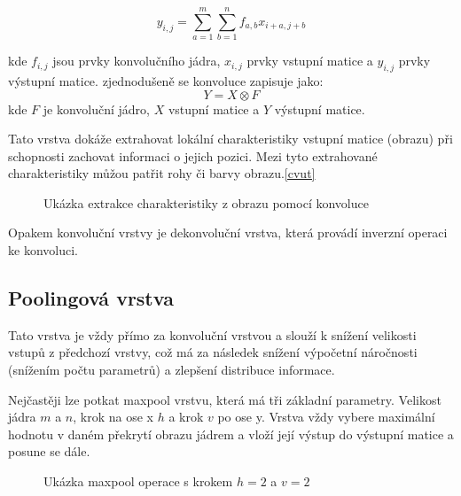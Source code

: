\documentclass[FM,BP,fonts]{tulthesis}
\begin{document}
\begin{equation}
    y_{i,j} = \sum_{a = 1}^{m} \sum_{b = 1}^{n} f_{a,b}x_{i+a,j+b}
\end{equation}

kde $f_{i,j}$ jsou prvky konvolučního jádra, $x_{i,j}$ prvky vstupní matice a $y_{i,j}$ prvky výstupní matice. zjednodušeně se konvoluce zapisuje jako:
\begin{equation}
    Y = X \otimes F
\end{equation}
kde $F$ je konvoluční jádro, $X$ vstupní matice a $Y$ výstupní matice.

Tato vrstva dokáže extrahovat lokální charakteristiky vstupní matice (obrazu) při schopnosti zachovat informaci o jejich pozici. Mezi tyto extrahované charakteristiky můžou patřit rohy či barvy obrazu.\ref{cvut}


\begin{figure}[htbp]
	\centering
	\caption{Ukázka extrakce charakteristiky z obrazu pomocí konvoluce }
	\label{fig:nezamestnanost}
\end{figure}

Opakem konvoluční vrstvy je dekonvoluční vrstva, která provádí inverzní operaci ke konvoluci. 

\subsection{Poolingová vrstva}
Tato vrstva je vždy přímo za konvoluční vrstvou a slouží k snížení velikosti vstupů z předchozí vrstvy, což má za následek snížení výpočetní náročnosti (snížením počtu parametrů) a zlepšení distribuce informace.

Nejčastěji lze potkat maxpool vrstvu, která má tři základní parametry. Velikost jádra $m$ a $n$, krok na ose x $h$ a krok $v$ po ose y. Vrstva vždy vybere maximální hodnotu v daném překrytí obrazu jádrem a vloží její výstup do výstupní matice a posune se dále.

\begin{figure}[htbp]
	\centering
	\caption{Ukázka maxpool operace s krokem $h=2$ a $v=2$ }
	\label{fig:nezamestnanost}
\end{figure}
\end{document}
